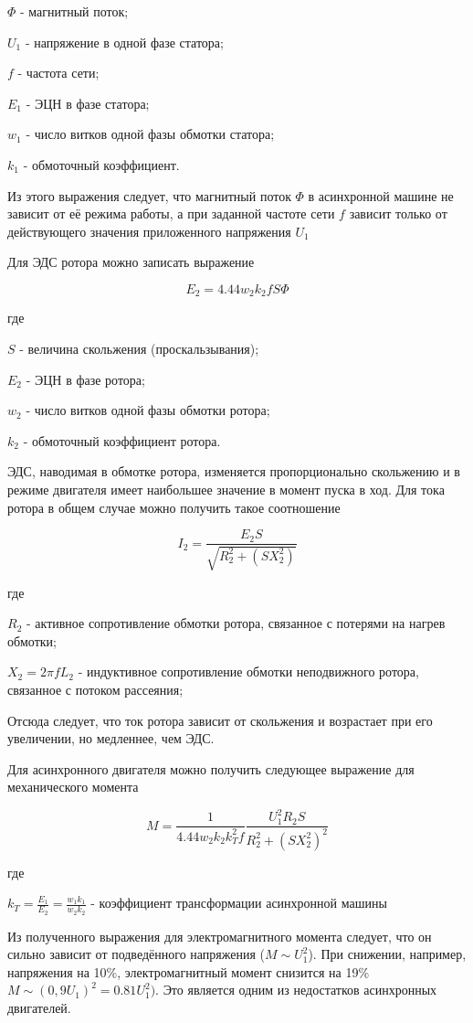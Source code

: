  $\Phi$ -  магнитный поток;
 
 $U_1$ -	напряжение в одной фазе статора;
 
 $f$   - частота сети;
 
 $E_1$	- ЭЦН в фазе статора;
 
 $w_1$ - число витков одной фазы обмотки статора;
 
 $k_1$  - обмоточный коэффициент.
   
Из этого выражения следует, что магнитный поток $\Phi $ в асинхронной машине не зависит от её режима работы, а при заданной частоте сети $f$ зависит только от действующего значения приложенного напряжения $U_1$


Для ЭДС ротора можно записать выражение 


$$  E_2 = 4.44 w_2 k_2 f S \Phi $$

где 


$S$ - величина скольжения (проскальзывания);

$E_2$	- ЭЦН в фазе ротора;

$w_2$ - число витков одной фазы обмотки ротора;

$k_2$ - обмоточный коэффициент ротора.

ЭДС, наводимая в обмотке ротора, изменяется пропорционально скольжению и в режиме двигателя имеет наибольшее значение в момент пуска в ход.
Для тока ротора в общем случае можно получить такое соотношение

$$  I_2 = \frac{E_2 S}{\sqrt{R_2^2+(S X_2^2)}} $$

где 

$R_2$ -  активное сопротивление обмотки ротора, связанное с потерями на нагрев обмотки;  

$X_2 = 2 \pi f L_2$ - индуктивное сопротивление обмотки неподвижного ротора, связанное с потоком рассеяния;

Отсюда следует, что ток ротора зависит от скольжения и возрастает при его увеличении, но медленнее, чем ЭДС.

Для асинхронного двигателя можно получить следующее выражение для механического момента 

$$ M = \frac{1}{4.44 w_2 k_2 k_T^2 f} \frac{U_1^2 R_2 S}{R_2^2 + (S X_2^2)^2}$$

где 

$k_T = \frac{E_1}{E_2} = \frac{w_1 k_1}{w_2 k_2}$ - коэффициент трансформации асинхронной машины

Из полученного выражения для электромагнитного момента следует, что он сильно зависит от подведённого напряжения ($M \sim U_1^2$). При снижении, например, напряжения на 10\%, электромагнитный момент снизится на 19\% $M \sim (0,9U_1)^2=0.81 U_1^2)$. Это является одним из недостатков асинхронных двигателей. 

